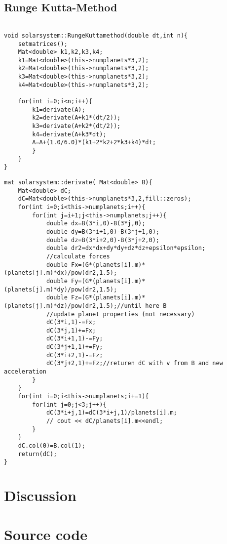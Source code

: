 \documentclass[10pt,a4paper]{article}
\begin{document}
\subsection{Runge Kutta-Method}
\begin{lstlisting}

void solarsystem::RungeKuttamethod(double dt,int n){
    setmatrices();
    Mat<double> k1,k2,k3,k4;
    k1=Mat<double>(this->numplanets*3,2);
    k2=Mat<double>(this->numplanets*3,2);
    k3=Mat<double>(this->numplanets*3,2);
    k4=Mat<double>(this->numplanets*3,2);

    for(int i=0;i<n;i++){
        k1=derivate(A);
        k2=derivate(A+k1*(dt/2));
        k3=derivate(A+k2*(dt/2));
        k4=derivate(A+k3*dt);
        A=A+(1.0/6.0)*(k1+2*k2+2*k3+k4)*dt;
        }
    }
}
\end{lstlisting}
\begin{lstlisting}
mat solarsystem::derivate( Mat<double> B){
    Mat<double> dC;
    dC=Mat<double>(this->numplanets*3,2,fill::zeros);
    for(int i=0;i<this->numplanets;i++){
        for(int j=i+1;j<this->numplanets;j++){
            double dx=B(3*i,0)-B(3*j,0);
            double dy=B(3*i+1,0)-B(3*j+1,0);
            double dz=B(3*i+2,0)-B(3*j+2,0);
            double dr2=dx*dx+dy*dy+dz*dz+epsilon*epsilon;
            //calculate forces
            double Fx=(G*(planets[i].m)*(planets[j].m)*dx)/pow(dr2,1.5);
            double Fy=(G*(planets[i].m)*(planets[j].m)*dy)/pow(dr2,1.5);
            double Fz=(G*(planets[i].m)*(planets[j].m)*dz)/pow(dr2,1.5);//until here B
            //update planet properties (not necessary)
            dC(3*i,1)-=Fx;
            dC(3*j,1)+=Fx;
            dC(3*i+1,1)-=Fy;
            dC(3*j+1,1)+=Fy;
            dC(3*i+2,1)-=Fz;
            dC(3*j+2,1)+=Fz;//returen dC with v from B and new acceleration
        }
    }
    for(int i=0;i<this->numplanets;i+=1){
        for(int j=0;j<3;j++){
            dC(3*i+j,1)=dC(3*i+j,1)/planets[i].m;
            // cout << dC/planets[i].m<<endl;
        }
    }
    dC.col(0)=B.col(1);
    return(dC);
}
\end{lstlisting}
\section{Discussion}

\section{Source code}
\end{document}
